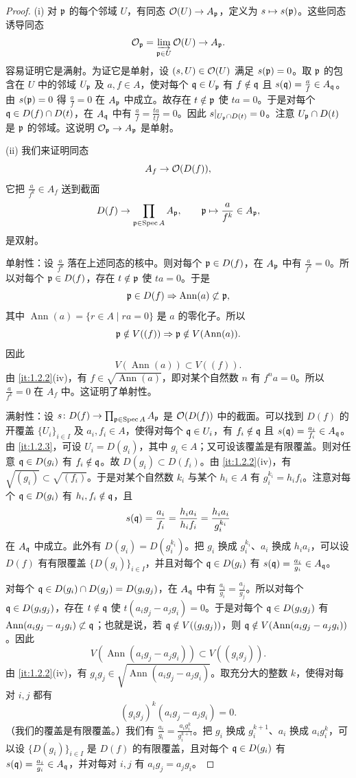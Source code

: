 \begin{proof}
(i) 对 $\mathfrak{p}$ 的每个邻域 $U$，有同态 $\mathcal{O}(U)\to A_{\mathfrak{p}}$，定义为 $s\mapsto s(\mathfrak{p})$。这些同态诱导同态
\[
\mathcal{O}_{\mathfrak{p}}=\varinjlim_{\mathfrak{p}\in U}\mathcal{O}(U)\to A_{\mathfrak{p}}.
\]
容易证明它是满射。为证它是单射，设 $(s,U)\in\mathcal{O}(U)$ 满足 $s(\mathfrak{p})=0$。取 $\mathfrak{p}$ 的包含在 $U$ 中的邻域 $U_{\mathfrak{p}}$ 及 $a,f\in A$，使对每个 $\mathfrak{q}\in U_{\mathfrak{p}}$ 有 $f\notin\mathfrak{q}$ 且 $s(\mathfrak{q})=\frac{a}{f}\in A_{\mathfrak{q}}$。由 $s(\mathfrak{p})=0$ 得 $\frac{a}{f}=0$ 在 $A_{\mathfrak{p}}$ 中成立。故存在 $t\notin\mathfrak{p}$ 使 $ta=0$。于是对每个 $\mathfrak{q}\in D(f)\cap D(t)$，在 $A_{\mathfrak{q}}$ 中有 $\frac{a}{f}=\frac{ta}{tf}=0$。因此 $s|_{U_{\mathfrak{p}}\cap D(t)}=0$。注意 $U_{\mathfrak{p}}\cap D(t)$ 是 $\mathfrak{p}$ 的邻域。这说明 $\mathcal{O}_{\mathfrak{p}}\to A_{\mathfrak{p}}$ 是单射。

(ii) 我们来证明同态
\[
A_f\to\mathcal{O}(D(f)),
\]
它把 $\frac{a}{f^k}\in A_f$ 送到截面
\[
D(f)\to\prod_{\mathfrak{p}\in\operatorname{Spec} A}A_{\mathfrak{p}},\qquad \mathfrak{p}\mapsto \frac{a}{f^k}\in A_{\mathfrak{p}},
\]
是双射。

单射性：设 $\frac{a}{f^k}$ 落在上述同态的核中。则对每个 $\mathfrak{p}\in D(f)$，在 $A_{\mathfrak{p}}$ 中有 $\frac{a}{f^k}=0$。所以对每个 $\mathfrak{p}\in D(f)$，存在 $t\notin\mathfrak{p}$ 使 $ta=0$。于是
\[
\mathfrak{p}\in D(f)\Rightarrow \operatorname{Ann}(a)\not\subset\mathfrak{p},
\]
其中 $\operatorname{Ann}(a)=\{r\in A\mid ra=0\}$ 是 $a$ 的零化子。所以
\[
\mathfrak{p}\notin V((f))\Rightarrow \mathfrak{p}\notin V(\operatorname{Ann}(a)).
\]
因此
\[
V(\operatorname{Ann}(a))\subset V((f)).
\]
由 \ref{it:1.2.2}(iv)，有 $f\in\sqrt{\operatorname{Ann}(a)}$，即对某个自然数 $n$ 有 $f^na=0$。所以 $\frac{a}{f^k}=0$ 在 $A_f$ 中。这证明了单射性。

满射性：设 $s\colon D(f)\to\prod_{\mathfrak{p}\in\operatorname{Spec} A}A_{\mathfrak{p}}$ 是 $\mathcal{O}(D(f))$ 中的截面。可以找到 $D(f)$ 的开覆盖 $\{U_i\}_{i\in I}$ 及 $a_i,f_i\in A$，使得对每个 $\mathfrak{q}\in U_i$，有 $f_i\notin\mathfrak{q}$ 且 $s(\mathfrak{q})=\frac{a_i}{f_i}\in A_{\mathfrak{q}}$。由 \ref{it:1.2.3}，可设 $U_i=D(g_i)$，其中 $g_i\in A$；又可设该覆盖是有限覆盖。则对任意 $\mathfrak{q}\in D(g_i)$ 有 $f_i\notin\mathfrak{q}$。故 $D(g_i)\subset D(f_i)$。由 \ref{it:1.2.2}(iv)，有 $\sqrt{(g_i)}\subset\sqrt{(f_i)}$。于是对某个自然数 $k_i$ 与某个 $h_i\in A$ 有 $g_i^{k_i}=h_if_i$。注意对每个 $\mathfrak{q}\in D(g_i)$ 有 $h_i,f_i\notin\mathfrak{q}$，且
\[
s(\mathfrak{q})=\frac{a_i}{f_i}=\frac{h_ia_i}{h_if_i}=\frac{h_ia_i}{g_i^{k_i}}
\]
在 $A_{\mathfrak{q}}$ 中成立。此外有 $D(g_i)=D(g_i^{k_i})$。把 $g_i$ 换成 $g_i^{k_i}$、$a_i$ 换成 $h_ia_i$，可以设 $D(f)$ 有有限覆盖 $\{D(g_i)\}_{i\in I}$，并且对每个 $\mathfrak{q}\in D(g_i)$ 有 $s(\mathfrak{q})=\frac{a_i}{g_i}\in A_{\mathfrak{q}}$。

对每个 $\mathfrak{q}\in D(g_i)\cap D(g_j)=D(g_ig_j)$，在 $A_{\mathfrak{q}}$ 中有 $\frac{a_i}{g_i}=\frac{a_j}{g_j}$。所以对每个 $\mathfrak{q}\in D(g_ig_j)$，存在 $t\notin\mathfrak{q}$ 使 $t(a_ig_j-a_jg_i)=0$。于是对每个 $\mathfrak{q}\in D(g_ig_j)$ 有 $\operatorname{Ann}(a_ig_j-a_jg_i)\not\subset\mathfrak{q}$；也就是说，若 $\mathfrak{q}\notin V((g_ig_j))$，则 $\mathfrak{q}\notin V(\operatorname{Ann}(a_ig_j-a_jg_i))$。因此
\[
V(\operatorname{Ann}(a_ig_j-a_jg_i))\subset V((g_ig_j)).
\]
由 \ref{it:1.2.2}(iv)，有 $g_ig_j\in\sqrt{\operatorname{Ann}(a_ig_j-a_jg_i)}$。取充分大的整数 $k$，使得对每对 $i,j$ 都有
\[
(g_ig_j)^k(a_ig_j-a_jg_i)=0.
\]
（我们的覆盖是有限覆盖。）我们有 $\frac{a_i}{g_i}=\frac{a_ig_i^k}{g_i^{k+1}}$。把 $g_i$ 换成 $g_i^{k+1}$、$a_i$ 换成 $a_ig_i^k$，可以设 $\{D(g_i)\}_{i\in I}$ 是 $D(f)$ 的有限覆盖，且对每个 $\mathfrak{q}\in D(g_i)$ 有 $s(\mathfrak{q})=\frac{a_i}{g_i}\in A_{\mathfrak{q}}$，并对每对 $i,j$ 有 $a_ig_j=a_jg_i$。


\end{proof}
